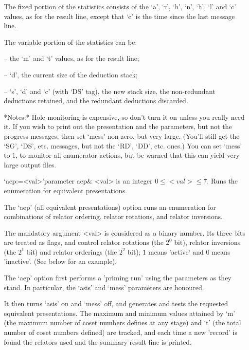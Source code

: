 The fixed  portion of  the statistics consists  of the `a',  `r', `h',
`n', `h', `l' and `c' values,  as for the result line, except that `c'
is the time since the last message line.

The variable portion of the statistics can be:

\beginlist

\item{--}  the `m' and `t' values, as for the result line;
\item{--}  `d', the current size of the deduction stack;
\item{--}  `s', `d' and `c' (with `DS' tag), the new stack size,
the non-redundant deductions retained, and the redundant deductions
discarded.

\endlist

*Notes:*
Hole monitoring  is expensive, so don't  turn it on  unless you really
need  it.   If  you  wish  to  print  out  the  presentation  and  the
parameters, but  not the progress messages, then  set `mess' non-zero,
but very large.  (You'll still  get the `SG', `DS', etc. messages, but
not the `RD', `DD', etc. ones.)  You can set `mess' to $1$, to monitor
all enumerator actions,  but be warned that this  can yield very large
output files.





\beginitems

\>`aep:=<val>'{parameter aep}&
<val> is  an integer $0 \leq  <val> \leq 7$. Runs  the enumeration for
equivalent presentations.

\enditems

The `aep'  (all equivalent  presentations) option runs  an enumeration
for combinations  of relator ordering, relator  rotations, and relator
inversions.

The mandatory  argument <val> is  considered as a binary  number.  Its
three bits  are treated as  flags, and control relator  rotations (the
$2^0$ bit),  relator inversions (the $2^1$ bit)  and relator orderings
(the $2^2$  bit); $1$  means 'active' and  $0$ means  'inactive'. (See
below for an example).

The `aep' option  first performs a 'priming run'  using the parameters
as they  stand.  In particular,  the `asis' and `mess'  parameters are
honoured.

It then  turns `asis' on and  `mess' off, and generates  and tests the
requested  equivalent presentations.  The  maximum and  minimum values
attained by  `m' (the maximum number  of coset numbers  defines at any
stage)  and  `t' (the  total  number  of  coset numbers  defined)  are
tracked, and each  time a new 'record' is found  the relators used and
the summary result line is printed.

